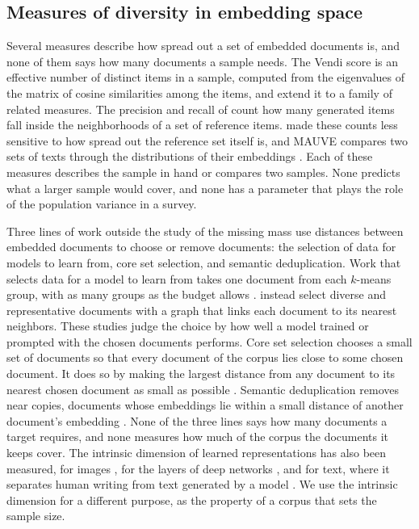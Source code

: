 \subsection{Measures of diversity in embedding space}

Several measures describe how spread out a set of embedded documents is, and none of them says how many documents a sample needs. The Vendi score \citep{friedman2023vendi} is an effective number of distinct items in a sample, computed from the eigenvalues of the matrix of cosine similarities among the items, and \citet{pasarkar2024cousins} extend it to a family of related measures. The precision and recall of \citet{kynkaanniemi2019} count how many generated items fall inside the neighborhoods of a set of reference items. \citet{naeem2020} made these counts less sensitive to how spread out the reference set itself is, and MAUVE compares two sets of texts through the distributions of their embeddings \citep{pillutla2021mauve}. Each of these measures describes the sample in hand or compares two samples. None predicts what a larger sample would cover, and none has a parameter that plays the role of the population variance in a survey.

Three lines of work outside the study of the missing mass use distances between embedded documents to choose or remove documents: the selection of data for models to learn from, core set selection, and semantic deduplication. Work that selects data for a model to learn from takes one document from each $k$-means group, with as many groups as the budget allows \citep{chang2021training,yuan2020coldstart,hacohen2022active,zhang2023autocot}. \citet{su2023selective} instead select diverse and representative documents with a graph that links each document to its nearest neighbors. These studies judge the choice by how well a model trained or prompted with the chosen documents performs. Core set selection chooses a small set of documents so that every document of the corpus lies close to some chosen document. It does so by making the largest distance from any document to its nearest chosen document as small as possible \citep{sener2018coreset}. Semantic deduplication removes near copies, documents whose embeddings lie within a small distance of another document's embedding \citep{abbas2023semdedup,lee2022dedup}. None of the three lines says how many documents a target requires, and none measures how much of the corpus the documents it keeps cover. The intrinsic dimension of learned representations has also been measured, for images \citep{pope2021intrinsic}, for the layers of deep networks \citep{ansuini2019}, and for text, where it separates human writing from text generated by a model \citep{tulchinskii2023}. We use the intrinsic dimension for a different purpose, as the property of a corpus that sets the sample size.

